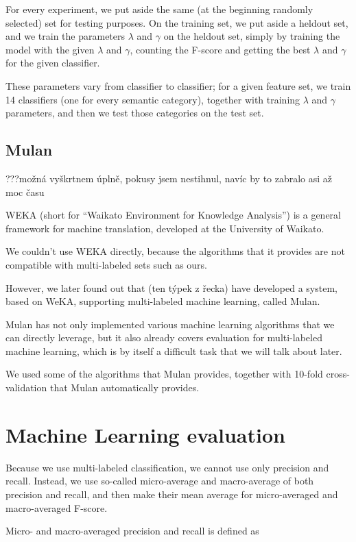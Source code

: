 \documentclass[letterpaper]{article}
\begin{document}
For every experiment, we put aside the same (at the beginning randomly selected) set for testing purposes. 
On the training set, we put aside a heldout set, and we train the parameters $\lambda$ and $\gamma$ on the heldout set, simply by training the model with the given $\lambda$ and $\gamma$, counting the F-score and getting the best $\lambda$ and $\gamma$ for the given classifier.

These parameters vary from classifier to classifier; for a given feature set, we train 14 classifiers (one for every semantic category), together with training $\lambda$ and $\gamma$ parameters, and then we test those categories on the test set.

\subsection{Mulan}
???možná vyškrtnem úplně, pokusy jsem nestihnul, navíc by to zabralo asi až moc času

WEKA (short for ``Waikato Environment for Knowledge Analysis'') is a general framework for machine translation, developed at the University of Waikato.

We couldn't use WEKA directly, because the algorithms that it provides are not compatible with multi-labeled sets such as ours. 

However, we later found out  that (ten týpek z řecka) have developed a system, 
based on WeKA, supporting multi-labeled machine learning, called Mulan.

Mulan has not only implemented various machine learning algorithms that we can directly leverage, but it also already 
covers evaluation for multi-labeled machine learning, which is by itself a difficult task that we will talk about later.

We used some of the algorithms that Mulan provides, together with 10-fold cross-validation that Mulan automatically provides.

\section{Machine Learning evaluation}
Because we use multi-labeled classification, we cannot use only precision and recall. Instead, we use so-called micro-average and macro-average of both precision and recall, and then make their mean average for micro-averaged and macro-averaged F-score.

Micro- and macro-averaged precision and recall is defined as  
\end{document}
